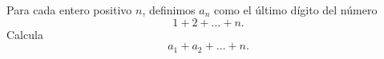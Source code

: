 Para cada entero positivo $n$, definimos $a_n$ como el último dígito del número
\[1+2+\dots+n.\]
Calcula
\[a_1+a_2+\dots+n.\]